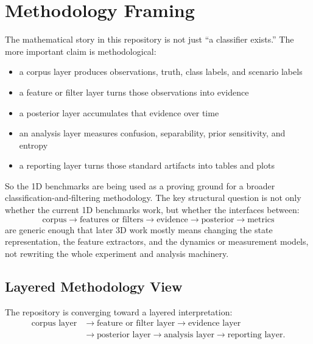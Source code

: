 \documentclass[11pt]{article}
\begin{document}
\section{Methodology Framing}

The mathematical story in this repository is not just ``a classifier exists.''
The more important claim is methodological:
\begin{itemize}[leftmargin=1.5em]
    \item a corpus layer produces observations, truth, class labels, and
    scenario labels
    \item a feature or filter layer turns those observations into evidence
    \item a posterior layer accumulates that evidence over time
    \item an analysis layer measures confusion, separability, prior
    sensitivity, and entropy
    \item a reporting layer turns those standard artifacts into tables and
    plots
\end{itemize}

So the 1D benchmarks are being used as a proving ground for a broader
classification-and-filtering methodology. The key structural question is not
only whether the current 1D benchmarks work, but whether the interfaces
between:
\begin{equation}
    \text{corpus} \rightarrow \text{features or filters} \rightarrow
    \text{evidence} \rightarrow \text{posterior} \rightarrow \text{metrics}
\end{equation}
are generic enough that later 3D work mostly means changing the state
representation, the feature extractors, and the dynamics or measurement models,
not rewriting the whole experiment and analysis machinery.

\subsection{Layered Methodology View}

The repository is converging toward a layered interpretation:
\begin{align}
    \text{corpus layer}
    &\rightarrow \text{feature or filter layer}
    \rightarrow \text{evidence layer} \\
    &\rightarrow \text{posterior layer}
    \rightarrow \text{analysis layer}
    \rightarrow \text{reporting layer}. \nonumber
\end{align}
\end{document}
